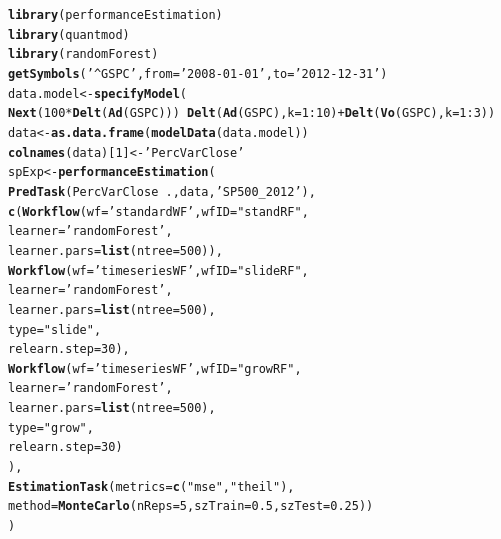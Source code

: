 \documentclass[10pt,a4paper]{article}\usepackage[]{graphicx}\usepackage[]{color}
\makeatletter
\newcommand{\hlnum}[1]{\textcolor[rgb]{0.686,0.059,0.569}{#1}}%
\newcommand{\hlstr}[1]{\textcolor[rgb]{0.192,0.494,0.8}{#1}}%
\newcommand{\hlopt}[1]{\textcolor[rgb]{0,0,0}{#1}}%
\newcommand{\hlstd}[1]{\textcolor[rgb]{0.345,0.345,0.345}{#1}}%
\newcommand{\hlkwb}[1]{\textcolor[rgb]{0.69,0.353,0.396}{#1}}%
\newcommand{\hlkwc}[1]{\textcolor[rgb]{0.333,0.667,0.333}{#1}}%
\newcommand{\hlkwd}[1]{\textcolor[rgb]{0.737,0.353,0.396}{\textbf{#1}}}%
\newenvironment{kframe}{%
 \def\at@end@of@kframe{}%
 \ifinner\ifhmode%
  \def\at@end@of@kframe{\end{minipage}}%
  \begin{minipage}{\columnwidth}%
 \fi\fi%
 \def\FrameCommand##1{\hskip\@totalleftmargin \hskip-\fboxsep
 \colorbox{shadecolor}{##1}\hskip-\fboxsep
     \hskip-\linewidth \hskip-\@totalleftmargin \hskip\columnwidth}%
 \MakeFramed {\advance\hsize-\width
   \@totalleftmargin\z@ \linewidth\hsize
   \@setminipage}}%
 {\par\unskip\endMakeFramed%
 \at@end@of@kframe}
\newenvironment{knitrout}{}{} %
\makeatother
\begin{document}
\begin{knitrout}\footnotesize
{}\color{fgcolor}\begin{kframe}
\begin{alltt}
\hlkwd{library}\hlstd{(performanceEstimation)}
\hlkwd{library}\hlstd{(quantmod)}
\hlkwd{library}\hlstd{(randomForest)}
\hlkwd{getSymbols}\hlstd{(}\hlstr{'^GSPC'}\hlstd{,}\hlkwc{from}\hlstd{=}\hlstr{'2008-01-01'}\hlstd{,}\hlkwc{to}\hlstd{=}\hlstr{'2012-12-31'}\hlstd{)}
\hlstd{data.model} \hlkwb{<-} \hlkwd{specifyModel}\hlstd{(}
  \hlkwd{Next}\hlstd{(}\hlnum{100}\hlopt{*}\hlkwd{Delt}\hlstd{(}\hlkwd{Ad}\hlstd{(GSPC)))} \hlopt{~} \hlkwd{Delt}\hlstd{(}\hlkwd{Ad}\hlstd{(GSPC),}\hlkwc{k}\hlstd{=}\hlnum{1}\hlopt{:}\hlnum{10}\hlstd{)}\hlopt{+}\hlkwd{Delt}\hlstd{(}\hlkwd{Vo}\hlstd{(GSPC),}\hlkwc{k}\hlstd{=}\hlnum{1}\hlopt{:}\hlnum{3}\hlstd{))}
\hlstd{data} \hlkwb{<-} \hlkwd{as.data.frame}\hlstd{(}\hlkwd{modelData}\hlstd{(data.model))}
\hlkwd{colnames}\hlstd{(data)[}\hlnum{1}\hlstd{]} \hlkwb{<-} \hlstr{'PercVarClose'}
\hlstd{spExp} \hlkwb{<-} \hlkwd{performanceEstimation}\hlstd{(}
  \hlkwd{PredTask}\hlstd{(PercVarClose} \hlopt{~} \hlstd{.,data,}\hlstr{'SP500_2012'}\hlstd{),}
  \hlkwd{c}\hlstd{(}\hlkwd{Workflow}\hlstd{(}\hlkwc{wf}\hlstd{=}\hlstr{'standardWF'}\hlstd{,}\hlkwc{wfID}\hlstd{=}\hlstr{"standRF"}\hlstd{,}
             \hlkwc{learner}\hlstd{=}\hlstr{'randomForest'}\hlstd{,}
             \hlkwc{learner.pars}\hlstd{=}\hlkwd{list}\hlstd{(}\hlkwc{ntree}\hlstd{=}\hlnum{500}\hlstd{)),}
    \hlkwd{Workflow}\hlstd{(}\hlkwc{wf}\hlstd{=}\hlstr{'timeseriesWF'}\hlstd{,}\hlkwc{wfID}\hlstd{=}\hlstr{"slideRF"}\hlstd{,}
             \hlkwc{learner}\hlstd{=}\hlstr{'randomForest'}\hlstd{,}
             \hlkwc{learner.pars}\hlstd{=}\hlkwd{list}\hlstd{(}\hlkwc{ntree}\hlstd{=}\hlnum{500}\hlstd{),}
             \hlkwc{type}\hlstd{=}\hlstr{"slide"}\hlstd{,}
             \hlkwc{relearn.step}\hlstd{=}\hlnum{30}\hlstd{),}
    \hlkwd{Workflow}\hlstd{(}\hlkwc{wf}\hlstd{=}\hlstr{'timeseriesWF'}\hlstd{,}\hlkwc{wfID}\hlstd{=}\hlstr{"growRF"}\hlstd{,}
             \hlkwc{learner}\hlstd{=}\hlstr{'randomForest'}\hlstd{,}
             \hlkwc{learner.pars}\hlstd{=}\hlkwd{list}\hlstd{(}\hlkwc{ntree}\hlstd{=}\hlnum{500}\hlstd{),}
             \hlkwc{type}\hlstd{=}\hlstr{"grow"}\hlstd{,}
             \hlkwc{relearn.step}\hlstd{=}\hlnum{30}\hlstd{)}
   \hlstd{),}
  \hlkwd{EstimationTask}\hlstd{(}\hlkwc{metrics}\hlstd{=}\hlkwd{c}\hlstd{(}\hlstr{"mse"}\hlstd{,}\hlstr{"theil"}\hlstd{),}
                 \hlkwc{method}\hlstd{=}\hlkwd{MonteCarlo}\hlstd{(}\hlkwc{nReps}\hlstd{=}\hlnum{5}\hlstd{,}\hlkwc{szTrain}\hlstd{=}\hlnum{0.5}\hlstd{,}\hlkwc{szTest}\hlstd{=}\hlnum{0.25}\hlstd{))}
  \hlstd{)}
\end{alltt}
\end{kframe}
\end{knitrout}
\end{document}
